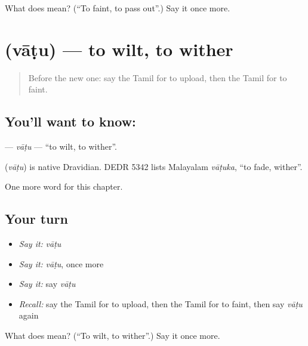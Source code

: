 \begin{tcolorbox}[breakable,colback=teal!4,colframe=teal!35!black,title={Before you move on}]
What does  mean? (\textquotedblleft{}To faint, to pass out\textquotedblright{}.) Say it once more.
\end{tcolorbox}
\section[\texorpdfstring{\ta{வாடு} (vāṭu)}{வாடு (vāṭu)}]{ (vāṭu) — to wilt, to wither}

\label{lesson:TA-C231-vatu}



\begin{quote}
Before the new one: say the Tamil for to upload, then the Tamil for to faint.
\end{quote}

\subsection*{You'll want to know: }
\textbf{} — \emph{vāṭu} — \textquotedblleft{}to wilt, to wither\textquotedblright{}.

\begin{cousinweb}
\textbf{} (\emph{vāṭu}) is native Dravidian. DEDR 5342 lists Malayalam \emph{vāṭuka}, \textquotedblleft{}to fade, wither\textquotedblright{}.
\end{cousinweb}

\begin{grammarlens}[title={What you've built}]
One more word for this chapter.
\end{grammarlens}

\subsection*{Your turn}
\begin{itemize}
\raggedright
  \item \emph{Say it:} \emph{vāṭu}
  \item \emph{Say it:} \emph{vāṭu}, once more
  \item \emph{Say it:} say \emph{vāṭu}
  \item \emph{Recall:} say the Tamil for to upload, then the Tamil for to faint, then say \emph{vāṭu} again
\end{itemize}

\begin{tcolorbox}[breakable,colback=teal!4,colframe=teal!35!black,title={Before you move on}]
What does  mean? (\textquotedblleft{}To wilt, to wither\textquotedblright{}.) Say it once more.
\end{tcolorbox}
